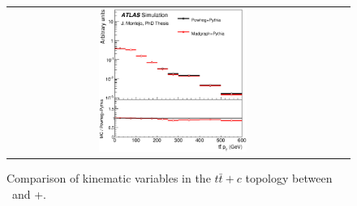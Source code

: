 \begin{figure}[p]
\begin{center}
\begin{tabular}{cc}
\includegraphics[width=0.46\textwidth]{Modeling/Figures/defaultcc_tt1cq_ttbar_pt_norm.eps} \\
\end{tabular}
\caption{Comparison of kinematic variables in the $t\bar{t}+c$ topology between \PP\ and \madgraph+\pythia.}
\label{fig:defaultcc_tt1c}
\end{center}
\end{figure}
